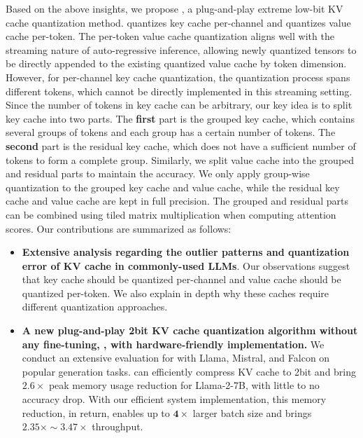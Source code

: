 Based on the above insights, we propose \kivi{}, a plug-and-play extreme low-bit KV cache quantization method.
\kivi{} quantizes key cache per-channel and quantizes value cache per-token.
The per-token value cache quantization aligns well with the streaming nature of auto-regressive inference, allowing newly quantized tensors to be directly appended to the existing quantized value cache by token dimension.
However, for per-channel key cache quantization, the quantization process spans different tokens, which cannot be directly implemented in this streaming setting.
Since the number of tokens in key cache can be arbitrary, 
our key idea is to split key cache into two parts.
The \textbf{first} part is the grouped key cache, which contains several groups of tokens and each group has a certain number of tokens.
The \textbf{second} part is the residual key cache, which does not have a sufficient number of tokens to form a complete group.
Similarly, we split value cache into the grouped and residual parts to maintain the accuracy.
We only apply group-wise quantization to the grouped key cache and value cache, while the residual key cache and value cache are kept in full precision.
The grouped and residual parts can be combined using tiled matrix multiplication when computing attention scores.
Our contributions are summarized as follows:

\begin{itemize}
    \item \textbf{Extensive analysis regarding the outlier patterns and quantization error of KV cache in commonly-used LLMs}.
    Our observations suggest that key cache should be quantized per-channel and value cache should be quantized per-token.
We also explain in depth why these caches require different quantization approaches.

     \item \textbf{A new plug-and-play 2bit KV cache quantization algorithm without any fine-tuning, \kivi{}, with hardware-friendly implementation.}
     We conduct an extensive evaluation for \kivi{} with Llama, Mistral, and Falcon on popular generation tasks.
    \kivi{} can efficiently compress KV cache to 2bit and bring $\mathbf{2.6\times}$ peak memory usage reduction for Llama-2-7B, with little to no accuracy drop.
    With our efficient system implementation, this memory reduction, in return, enables up to $\mathbf{4\times}$ larger batch size and brings $\mathbf{2.35\times \sim 3.47\times}$ throughput. 

\end{itemize}